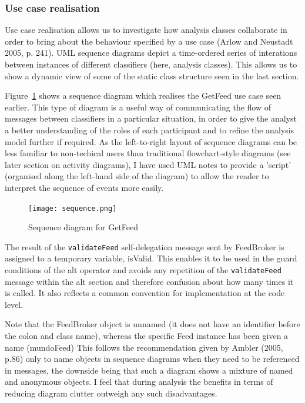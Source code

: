 \documentclass[a4paper]{article}
\begin{document}
\subsubsection{Use case realisation}

Use case realisation allows us to investigate how analysis classes collaborate in order to bring about the behaviour specified by a use case (Arlow and Neustadt 2005, p. 241). UML sequence diagrams depict a time-ordered series of interations between instances of different classifiers (here, analysis classes). This allows us to show a dynamic view of some of the static class structure seen in the last section.

Figure~\ref{sequence-diagram-image} shows a sequence diagram which realises the \textsf{GetFeed} use case seen earlier. This type of diagram is a useful way of communicating the flow of messages between classifiers in a particular situation, in order to give the analyst a better understanding of the roles of each participant and to refine the analysis model further if required. As the left-to-right layout of sequence diagrams can be less familiar to non-techical users than traditional flowchart-style diagrams (see later section on activity diagrams), I have used UML notes to provide a 'script' (organised along the left-hand side of the diagram) to allow the reader to interpret the sequence of events more easily.

\begin{figure}
  \begin{center}
    \texttt{[image: sequence.png]}
  \end{center}
  \caption{Sequence diagram for \textsf{GetFeed}}
  \label{sequence-diagram-image}
\end{figure}

The result of the \texttt{validateFeed} self-delegation message sent by \textsf{FeedBroker} is assigned to a temporary variable, \textsf{isValid}. This enables it to be used in the guard conditions of the \textsf{alt} operator and avoids any repetition of the \texttt{validateFeed} message within the \textsf{alt} section and therefore confusion about how many times it is called. It also reflects a common convention for implementation at the code level.

Note that the \textsf{FeedBroker} object is unnamed (it does not have an identifier before the colon and class name), whereas the specific \textsf{Feed} instance has been given a name (\textsf{mundoFeed}) This follows the recommendation given by Ambler (2005, p.86) only to name objects in sequence diagrams when they need to be referenced in messages, the downside being that such a diagram shows a mixture of named and anonymous objects. I feel that during analysis the benefits in terms of reducing diagram clutter outweigh any such disadvantages.
\end{document}
